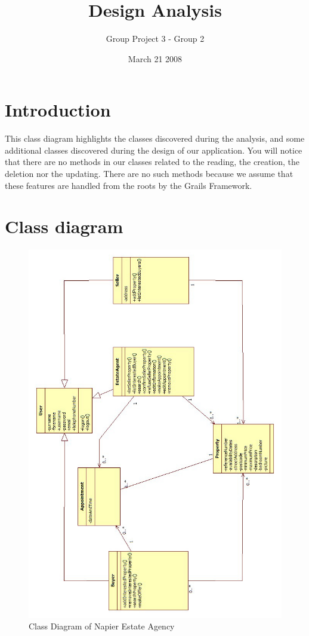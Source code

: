 \documentclass[a4paper,12pt]{article}
\title{Design Analysis}
\author{Group Project 3 - Group 2}
\date{March 21 2008}
\begin{document}
\maketitle
\newpage
\tableofcontents
\newpage



\section{Introduction}
This class diagram highlights the classes discovered during the analysis,
and some additional classes discovered during the design of our application.
You will notice that there are no methods in our classes related to the reading, the creation, the deletion nor the updating.
There are no such methods because we assume that these features are handled from the roots by the Grails Framework.

\section{Class diagram}
\begin{figure}[htbp]
\begin{center}
\includegraphics[width=\linewidth]{pics/classDiagram.jpg}
\end{center}
\caption{\footnotesize Class Diagram of Napier Estate Agency}
\end{figure}
\end{document}
